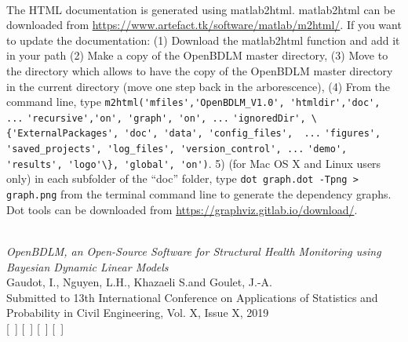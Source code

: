 \begin{description}[style=unboxed]
\item[\textbf{Where does the HTML documentation come from ?}] \leavevmode \\
The HTML documentation is generated using matlab2html.
matlab2html can be downloaded from \url{https://www.artefact.tk/software/matlab/m2html/}.
If you want to update the documentation: (1) Download the matlab2html function and add it in your \MATLAB{} path (2) Make a copy of the OpenBDLM master directory, (3) Move to the directory which allows to have the copy of the OpenBDLM master directory in the current directory (move one step back in the arborescence), (4) From the \MATLAB{} command line, type \colorbox{light-gray}{\lstinline[basicstyle = \mlttfamily \small, backgroundcolor = \color{light-gray}]!m2html('mfiles','OpenBDLM_V1.0', 'htmldir','doc', ...!}
\colorbox{light-gray}{\lstinline[basicstyle = \mlttfamily \small, backgroundcolor = \color{light-gray}]!'recursive','on', 'graph', 'on', ...!}
\colorbox{light-gray}{\lstinline[basicstyle = \mlttfamily \small, backgroundcolor = \color{light-gray}]!'ignoredDir', \{'ExternalPackages', 'doc', 'data', 'config_files',  ...!}
\colorbox{light-gray}{\lstinline[basicstyle = \mlttfamily \small, backgroundcolor = \color{light-gray}]!'figures', 'saved_projects', 'log_files', 'version_control', ...!}
\colorbox{light-gray}{\lstinline[basicstyle = \mlttfamily \small, backgroundcolor = \color{light-gray}]!'demo', 'results', 'logo'\}, 'global', 'on')!}.
5) (for Mac OS X and Linux users only) in each subfolder of the ``doc'' folder, type \colorbox{light-gray}{\lstinline[basicstyle = \mlttfamily \small, backgroundcolor = \color{light-gray}]!dot graph.dot -Tpng > graph.png!} from the terminal command line to generate the dependency graphs. Dot tools can be downloaded from \url{https://graphviz.gitlab.io/download/}.

\item[\textbf{How to cite OpenBDLM ?}] \leavevmode \\

\noindent \emph{OpenBDLM, an Open-Source Software for Structural Health Monitoring using Bayesian Dynamic Linear Models}\\{\small
            Gaudot, I., Nguyen, L.H., Khazaeli S.and Goulet, J.-A.\\
            Submitted to 13th International Conference on Applications of Statistics and Probability in Civil Engineering, Vol. X, Issue X, 2019\\}
      [~] [~]  [~] [~] \cite{Gaudot2019OpenBDLM}\\[4pt]


\end{description}




